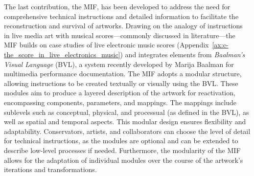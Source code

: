 The last contribution, the MIF, has been developed to address the need for comprehensive technical instructions and detailed information to facilitate the reconstruction and survival of artworks. Drawing on the analogy of instructions in live media art with musical scores—commonly discussed in literature—the MIF builds on case studies of live electronic music scores (Appendix~\ref{ax:c-the_score_in_live_electronics_music}) and integrates elements from \textit{Baalman’s Visual Language} (BVL), a system recently developed by Marija Baalman for multimedia performance documentation. The MIF adopts a modular structure, allowing instructions to be created textually or visually using the BVL. These modules aim to produce a layered description of the artwork for reactivation, encompassing components, parameters, and mappings. The mappings include sublevels such as conceptual, physical, and processual (as defined in the BVL), as well as spatial and temporal aspects. This modular design ensures flexibility and adaptability. Conservators, artists, and collaborators can choose the level of detail for technical instructions, as the modules are optional and can be extended to describe low-level processes if needed. Furthermore, the modularity of the MIF allows for the adaptation of individual modules over the course of the artwork’s iterations and transformations.\\
\newline
